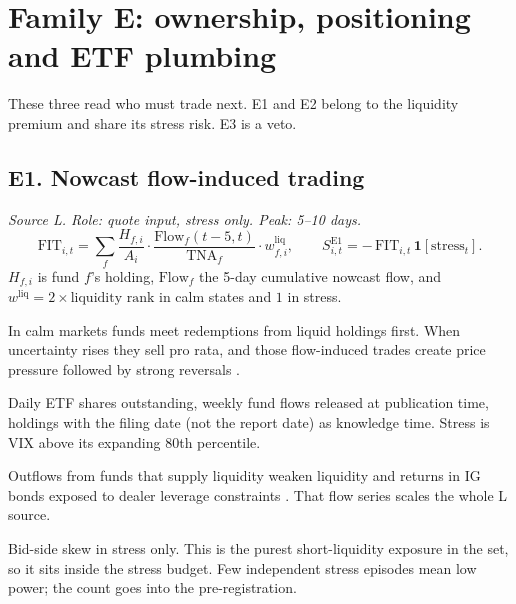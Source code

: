 \documentclass[11pt,letterpaper]{article}
\newcommand{\ind}[1]{\mathbf{1}\!\left[#1\right]}
\newcommand{\FIT}{\mathrm{FIT}}
\begin{document}
\section{Family E: ownership, positioning and ETF plumbing}
\label{sec:famE}

These three read who must trade next. E1 and E2 belong to the liquidity premium and share its stress risk. E3 is a veto.

\subsection{E1. Nowcast flow-induced trading}
\emph{Source L. Role: quote input, stress only. Peak: 5--10 days.}
\begin{equation}
\FIT_{i,t}=\sum_{f}\frac{H_{f,i}}{A_i}\cdot\frac{\mathrm{Flow}_f(t-5,t)}{\mathrm{TNA}_f}\cdot w^{\mathrm{liq}}_{f,i},
\qquad
S^{\mathrm{E1}}_{i,t}=-\,\FIT_{i,t}\,\ind{\text{stress}_t}.
\end{equation}
$H_{f,i}$ is fund $f$'s holding, $\mathrm{Flow}_f$ the 5-day cumulative nowcast flow, and $w^{\mathrm{liq}}=2\times\text{liquidity rank}$ in calm states and $1$ in stress.
\begin{spec}
\item[Mechanism and evidence.] In calm markets funds meet redemptions from liquid holdings first. When uncertainty rises they sell pro rata, and those flow-induced trades create price pressure followed by strong reversals \cite{jlw2021}.
\item[Build.] Daily ETF shares outstanding, weekly fund flows released at publication time, holdings with the filing date (not the report date) as knowledge time. Stress is VIX above its expanding 80th percentile.
\item[Conditioning.] Outflows from funds that supply liquidity weaken liquidity and returns in IG bonds exposed to dealer leverage constraints \cite{gjrw}. That flow series scales the whole L source.
\item[Role in the quote.] Bid-side skew in stress only. This is the purest short-liquidity exposure in the set, so it sits inside the stress budget. Few independent stress episodes mean low power; the count goes into the pre-registration.
\end{spec}
\end{document}
